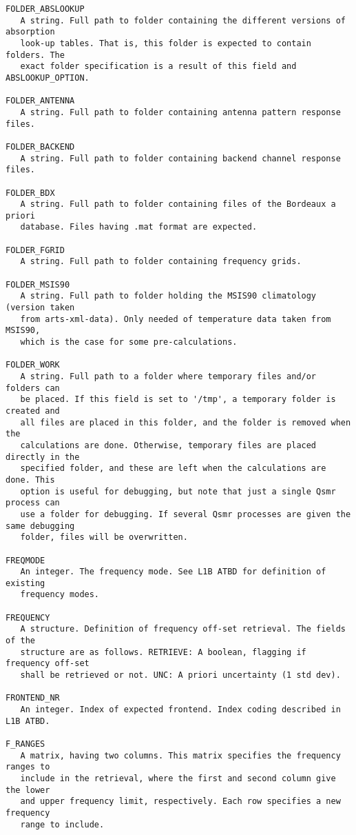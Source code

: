 \begin{verbatim}
FOLDER_ABSLOOKUP
   A string. Full path to folder containing the different versions of absorption
   look-up tables. That is, this folder is expected to contain folders. The
   exact folder specification is a result of this field and ABSLOOKUP_OPTION.

FOLDER_ANTENNA
   A string. Full path to folder containing antenna pattern response files.

FOLDER_BACKEND
   A string. Full path to folder containing backend channel response files.

FOLDER_BDX
   A string. Full path to folder containing files of the Bordeaux a priori
   database. Files having .mat format are expected.   

FOLDER_FGRID
   A string. Full path to folder containing frequency grids.   

FOLDER_MSIS90
   A string. Full path to folder holding the MSIS90 climatology (version taken
   from arts-xml-data). Only needed of temperature data taken from MSIS90,
   which is the case for some pre-calculations.

FOLDER_WORK
   A string. Full path to a folder where temporary files and/or folders can 
   be placed. If this field is set to '/tmp', a temporary folder is created and
   all files are placed in this folder, and the folder is removed when the
   calculations are done. Otherwise, temporary files are placed directly in the 
   specified folder, and these are left when the calculations are done. This
   option is useful for debugging, but note that just a single Qsmr process can
   use a folder for debugging. If several Qsmr processes are given the same debugging
   folder, files will be overwritten.

FREQMODE
   An integer. The frequency mode. See L1B ATBD for definition of existing
   frequency modes.

FREQUENCY 
   A structure. Definition of frequency off-set retrieval. The fields of the
   structure are as follows. RETRIEVE: A boolean, flagging if frequency off-set
   shall be retrieved or not. UNC: A priori uncertainty (1 std dev).

FRONTEND_NR
   An integer. Index of expected frontend. Index coding described in L1B ATBD.

F_RANGES
   A matrix, having two columns. This matrix specifies the frequency ranges to
   include in the retrieval, where the first and second column give the lower
   and upper frequency limit, respectively. Each row specifies a new frequency
   range to include.


\end{verbatim}
